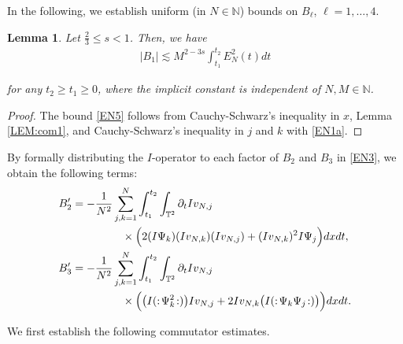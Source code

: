 \documentclass[letterpaper, 11pt,  reqno]{amsart}
\newtheorem{lemma}[theorem]{Lemma}
\newcommand{\1}{\hspace{0.5mm}\text{I}\hspace{0.2mm}}
\newcommand{\noi}{\noindent}
\newcommand{\T}{\mathbb{T}}
\newcommand{\N}{\mathbb{N}}
\newcommand{\dt}{\partial_t}
\newcommand{\les}{\lesssim}
\newcommand{\EN}{E_N}
\newcommand{\wick}[1]{:\!{#1}\!:}
\renewcommand{\l}{\ell}
\numberwithin{equation}{section}
\numberwithin{theorem}{section}
\begin{document}
In the following, 
we establish uniform (in $N \in \N$)
bounds on $B_\l$, $\l = 1, \dots,4$. 

\begin{lemma}
\label{LEM:com3} 
Let $\frac 23 \le s < 1$. Then, we have 
\begin{align} 
    | B_1 | \les M^{2 - 3s} \int_{t_1}^{t_2} \EN^2 (t) d t
\label{EN5}
\end{align} 

\noi
for any $t_2 \ge t_1 \ge 0$, 
where the implicit constant is independent of $N, M \in \N$.


\end{lemma}  



\begin{proof} 
The bound \eqref{EN5}
follows from 
Cauchy-Schwarz's inequality in $x$, 
Lemma \ref{LEM:com1}, 
and 
Cauchy-Schwarz's inequality in $j$ and $k$
with  \eqref{EN1a}.
\end{proof}










By formally distributing the $I$-operator 
to each factor of $B_2$ and $B_3$
in \eqref{EN3}, 
we obtain the following terms: 
\begin{align} 
\begin{split}
B_2' & =  
- \frac{1}{N^2}
\sum_{j, k =1}^N
\int_{t_1}^{t_2} \int_{\T^2}   \dt I v_{N,j} \\
&  \hphantom{XXXXX} 
\times
\Big( 2 (I \Psi_k)( I v_{N,k})( I v_{N,j}) + ( I v_{N,k})^2 I \Psi_j \Big) d x d t,  \\ 
B_3' & = 
- \frac{1}{N^2}\sum_{j, k =1}^N
 \int_{t_1}^{t_2} \int_{\T^2} \dt I v_{N,j} \\
 &  \hphantom{XXXXX} 
\times
  \Big( \big(I ( \wick{ \Psi_k^2 } ) \big)I v_{N,j} + 2 Iv_{N,k} \big(I ( \wick{\Psi_k \Psi_j})\big) \Big) d x d t . 
\end{split}
\label{EN4}
\end{align} 




\noi
We first establish  the following commutator estimates.
\end{document}
